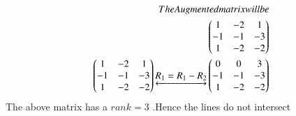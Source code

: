 \documentclass[journal,12pt,twocolumn]{IEEEtran}
\begin{document}
\begin{align}
    The Augmented matrix will be\notag\\
    \begin{pmatrix}1 & -2 & 1\\-1 & -1 & -3\\1 & -2 & -2\end{pmatrix}\notag\\
    \begin{pmatrix}1 & -2 & 1\\-1 & -1 & -3\\1 & -2 & -2\end{pmatrix}\underleftrightarrow{R_1=R_1-R_2}\begin{pmatrix}0 & 0 & 3\\-1 & -1 & -3\\1 & -2 & -2\end{pmatrix}\notag
\end{align}
The above matrix has a $rank=3$ .Hence the lines do not intersect
\end{document}
